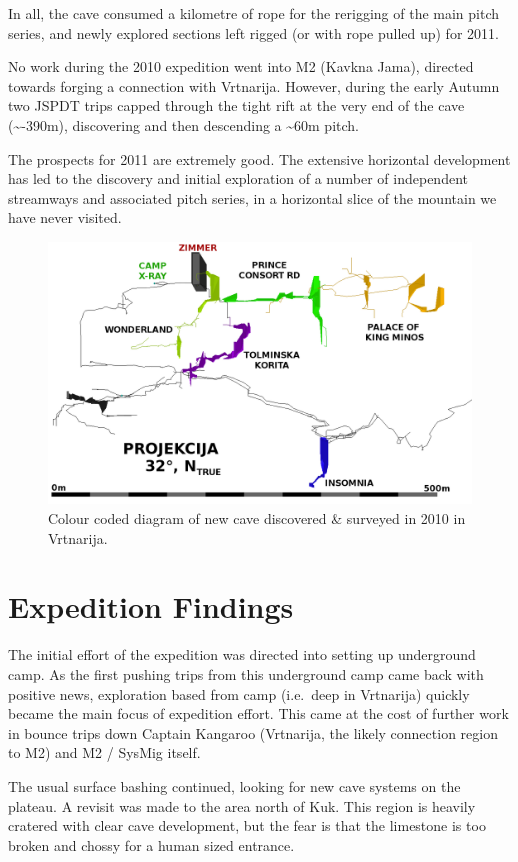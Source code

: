 In all, the cave consumed a kilometre of rope for the rerigging of the
main pitch series, and newly explored sections left rigged (or with rope
pulled up) for 2011.

No work during the 2010 expedition went into M2 (Kavkna Jama), directed
towards forging a connection with Vrtnarija. However, during the early
Autumn two JSPDT trips capped through the tight rift at the very end of
the cave (\textasciitilde{}-390m), discovering and then descending a
\textasciitilde{}60m pitch.

The prospects for 2011 are extremely good. The extensive horizontal
development has led to the discovery and initial exploration of a number
of independent streamways and associated pitch series, in a horizontal
slice of the mountain we have never visited.

\begin{figure}
\includegraphics[width=0.85\columnwidth]{2010/2010_deep_vrtnarija_colour_coded_inverted_labelled}
\caption{Colour coded diagram of new cave discovered \& surveyed in 2010 in
Vrtnarija.}
\end{figure}

\section{Expedition Findings}

The initial effort of the expedition was directed into setting up
underground camp. As the first pushing trips from this underground camp
came back with positive news, exploration based from camp (i.e.~deep in
Vrtnarija) quickly became the main focus of expedition effort. This came
at the cost of further work in bounce trips down Captain Kangaroo
(Vrtnarija, the likely connection region to M2) and M2 / SysMig itself.

The usual surface bashing continued, looking for new cave systems on the
plateau. A revisit was made to the area north of Kuk. This region is
heavily cratered with clear cave development, but the fear is that the
limestone is too broken and chossy for a human sized entrance.

